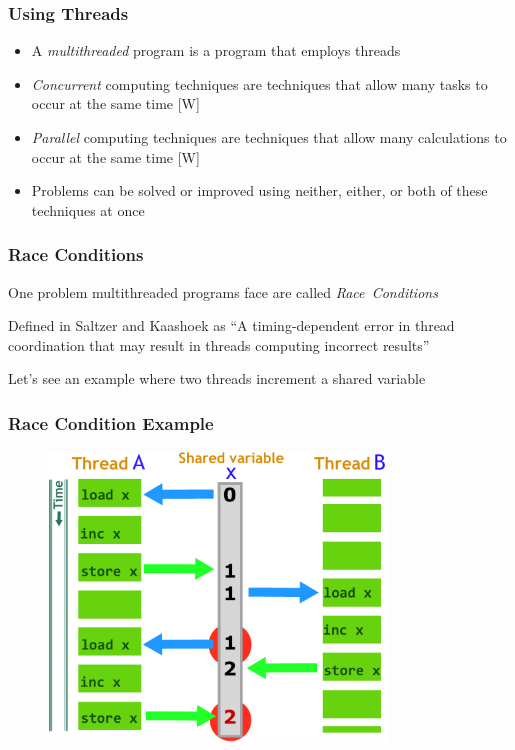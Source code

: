 \documentclass{beamer}
\newcommand{\linespace}{\vskip 0.25cm}
\begin{document}
\begin{frame}
\frametitle{Using Threads}

	\begin{itemize}
  		\item A \emph{multithreaded} program is a program that employs threads
  		
  		\linespace
  		
  		\item \emph{Concurrent} computing techniques are techniques that allow many tasks to occur at the same time [W]
  		
  		\linespace  		
  		
  		\item \emph{Parallel} computing techniques are techniques that allow many calculations to occur at the same time [W]
  		
  		\linespace  		
  		
  		\item Problems can be solved or improved using neither, either, or both of these techniques at once
	  \end{itemize}

\end{frame}


\begin{frame}
\frametitle{Race Conditions}

One problem multithreaded programs face are called \emph{Race~Conditions}

\linespace

Defined in Saltzer and Kaashoek as ``A timing-dependent error in thread coordination that may result in threads computing incorrect results'' 

\linespace

Let's see an example where two threads increment a shared variable
\end{frame}

\begin{frame}
\frametitle{Race Condition Example}
	\begin{figure}
		\includegraphics[width=0.8\textwidth]{Illustrations/RaceCondition}
		\label{fig:racecondition}
	\end{figure}

\end{frame}
\end{document}
